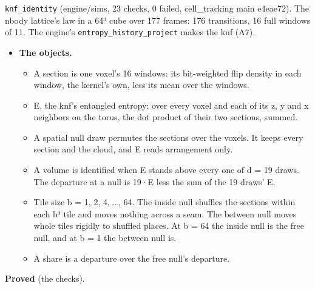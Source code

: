 \texttt{knf\_\allowbreak{}identity} (engine/sims, 23 checks, 0 failed, cell\_\allowbreak{}tracking main e4eae72). The nbody lattice's law in a 64³ cube over 177 frames: 176 transitions, 16 full windows of 11. The engine's \texttt{entropy\_\allowbreak{}history\_\allowbreak{}project} makes the knf (A7).

\begin{itemize}
\item \textbf{The objects.}

\begin{itemize}
\item A section is one voxel's 16 windows: its bit-weighted flip density in each window, the kernel's own, less its mean over the windows.
\item E, the knf's entangled entropy: over every voxel and each of its z, y and x neighbors on the torus, the dot product of their two sections, summed.
\item A spatial null draw permutes the sections over the voxels. It keeps every section and the cloud, and E reads arrangement only.
\item A volume is identified when E stands above every one of d = 19 draws. The departure at a null is 19·E less the sum of the 19 draws' E.
\item Tile size b = 1, 2, 4, …, 64. The inside null shuffles the sections within each b³ tile and moves nothing across a seam. The between null moves whole tiles rigidly to shuffled places. At b = 64 the inside null is the free null, and at b = 1 the between null is.
\item A share is a departure over the free null's departure.
\end{itemize}
\end{itemize}

\textbf{Proved} (the checks).

